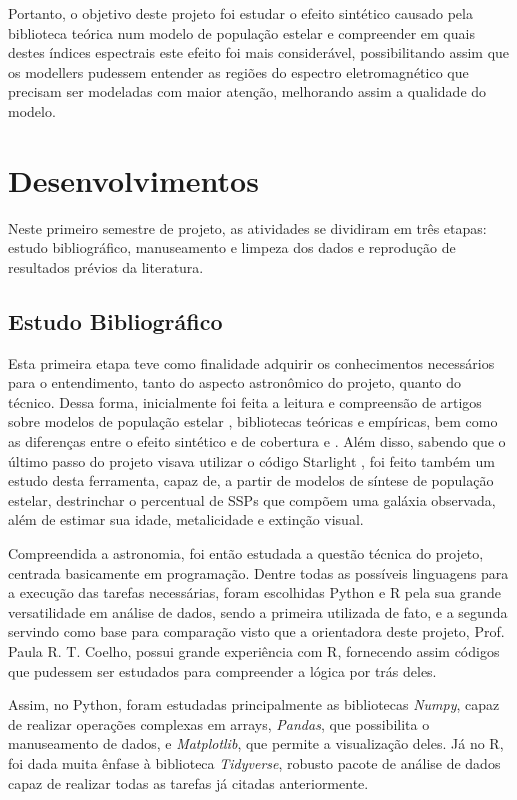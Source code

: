 \documentclass[12pt]{projeto}
\begin{document}
Portanto, o objetivo deste projeto foi estudar o efeito sintético causado pela biblioteca teórica num modelo de população estelar e compreender em quais destes índices espectrais este efeito foi mais considerável, possibilitando assim que os modellers pudessem entender as regiões do espectro eletromagnético que precisam ser modeladas com maior atenção, melhorando assim a qualidade do modelo.

\section{Desenvolvimentos}
Neste primeiro semestre de projeto, as atividades se dividiram em três etapas: estudo bibliográfico, manuseamento e limpeza dos dados e reprodução de resultados prévios da literatura.

\subsection{Estudo Bibliográfico}
Esta primeira etapa teve como finalidade adquirir os conhecimentos necessários para o entendimento, tanto do aspecto astronômico do projeto, quanto do técnico. Dessa forma, inicialmente foi feita a leitura e compreensão de artigos sobre modelos de população estelar \cite{BC03}, bibliotecas teóricas e empíricas, bem como as diferenças entre o efeito sintético e de cobertura \cite{Paula2014} e \cite{Paula2020}. Além disso, sabendo que o último passo do projeto visava utilizar o código Starlight \cite{starlight}, foi feito também um estudo desta ferramenta,
capaz de, a partir de modelos de síntese de população estelar, destrinchar o percentual de SSPs que compõem uma galáxia observada, além de estimar sua idade, metalicidade e extinção visual.

Compreendida a astronomia, foi então estudada a questão técnica do projeto, centrada basicamente em programação. Dentre todas as possíveis linguagens para a execução das tarefas necessárias, foram escolhidas Python e R pela sua grande versatilidade em análise de dados, sendo a primeira utilizada de fato, e a segunda servindo como base para comparação visto que a orientadora deste projeto, Prof. Paula R. T. Coelho, possui grande experiência com R, fornecendo assim códigos que pudessem ser estudados para compreender a lógica por trás deles.

Assim, no Python, foram estudadas principalmente as bibliotecas \textit{Numpy}, capaz de realizar operações complexas em arrays, \textit{Pandas}, que possibilita o manuseamento de dados, e \textit{Matplotlib}, que permite a visualização deles. Já no R, foi dada muita ênfase à biblioteca \textit{Tidyverse}, robusto pacote de análise de dados capaz de realizar todas as tarefas já citadas anteriormente.
\end{document}
